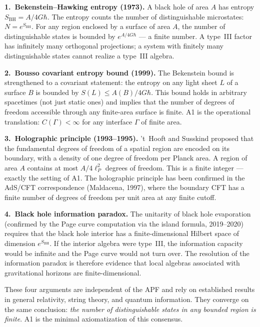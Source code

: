 \documentclass[11pt,a4paper]{article}
\theoremstyle{definition}
\begin{document}
\smallskip\noindent\textbf{1.\ Bekenstein--Hawking entropy (1973).}\quad
A black hole of area $A$ has entropy $S_{\mathrm{BH}} = A / 4G\hbar$.
The entropy counts the number of distinguishable microstates:
$N = e^{S_{\mathrm{BH}}}$.  For any region enclosed by a surface of
area $A$, the number of distinguishable states is bounded by
$e^{A/4G\hbar}$ --- a finite number.  A type~III factor has
infinitely many orthogonal projections; a system with finitely many
distinguishable states cannot realize a type~III algebra.

\smallskip\noindent\textbf{2.\ Bousso covariant entropy bound
(1999).}\quad
The Bekenstein bound is strengthened to a covariant statement:
the entropy on any light sheet $L$ of a surface $B$ is bounded by
$S(L) \le A(B) / 4G\hbar$.  This bound holds in arbitrary
spacetimes (not just static ones) and implies that the number of
degrees of freedom accessible through any finite-area surface is
finite.  A1 is the operational translation: $C(\Gamma) < \infty$
for any interface $\Gamma$ of finite area.

\smallskip\noindent\textbf{3.\ Holographic principle (1993--1995).}\quad
't~Hooft and Susskind proposed that the fundamental degrees of freedom
of a spatial region are encoded on its boundary, with a density of one
degree of freedom per Planck area.  A region of area $A$ contains at
most $A / 4\ell_P^2$ degrees of freedom.  This is a finite integer
--- exactly the setting of A1.  The holographic principle has been
confirmed in the AdS/CFT correspondence (Maldacena, 1997), where the
boundary CFT has a finite number of degrees of freedom per unit area
at any finite cutoff.

\smallskip\noindent\textbf{4.\ Black hole information paradox.}\quad
The unitarity of black hole evaporation (confirmed by the Page curve
computation via the island formula, 2019--2020) requires that the
black hole interior has a finite-dimensional Hilbert space of
dimension $e^{S_{\mathrm{BH}}}$.  If the interior algebra were
type~III, the information capacity would be infinite and the Page
curve would not turn over.  The resolution of the information paradox
is therefore evidence that local algebras associated with
gravitational horizons are finite-dimensional.

\smallskip\noindent These four arguments are independent of the APF
and rely on established results in general relativity, string theory,
and quantum information.  They converge on the same conclusion:
\emph{the number of distinguishable states in any bounded region is
finite}.  A1 is the minimal axiomatization of this consensus.
\end{document}
